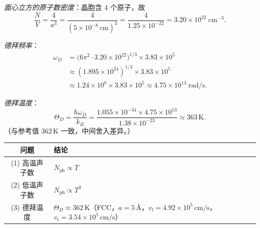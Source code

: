 \begin{derivationbox}[标准解题过程]
\textit{面心立方的原子数密度}：晶胞含 4 个原子，故
\begin{equation}
\frac{N}{V}=\frac{4}{a^3}=\frac{4}{(5\times10^{-8}\,\mathrm{cm})^3}=\frac{4}{1.25\times10^{-22}}=3.20\times10^{22}\;\mathrm{cm^{-3}}.
\end{equation}

\textit{德拜频率}：
\begin{align}
\omega_D&=\bigl(6\pi^2\cdot3.20\times10^{22}\bigr)^{1/3}\times3.83\times10^5\\
&\approx(1.895\times10^{24})^{1/3}\times3.83\times10^5\\
&\approx1.24\times10^8\times3.83\times10^5\approx4.75\times10^{13}\;\mathrm{rad/s}.
\end{align}

\textit{德拜温度}：
\begin{equation}
\Theta_D=\frac{\hbar\omega_D}{k_B}
=\frac{1.055\times10^{-34}\times4.75\times10^{13}}{1.38\times10^{-23}}
\approx\boxed{363\,\mathrm{K}}.
\end{equation}
（与参考值 $362\,\mathrm{K}$ 一致，中间舍入差异。）
\end{derivationbox}

\begin{formulabox}[答案汇总]
\begin{center}
\begin{tabular}{cl}
\toprule
问题 & 结论 \\
\midrule
(1) 高温声子数 & $N_{\text{ph}}\propto T$ \\
(2) 低温声子数 & $N_{\text{ph}}\propto T^3$ \\
(3) 德拜温度 & $\Theta_D\approx362\,\mathrm{K}$（FCC，$a=5\,\text{\AA}$，$v_l=4.92\times10^5\,\mathrm{cm/s}$，$v_t=3.54\times10^5\,\mathrm{cm/s}$） \\
\bottomrule
\end{tabular}
\end{center}
\end{formulabox}

